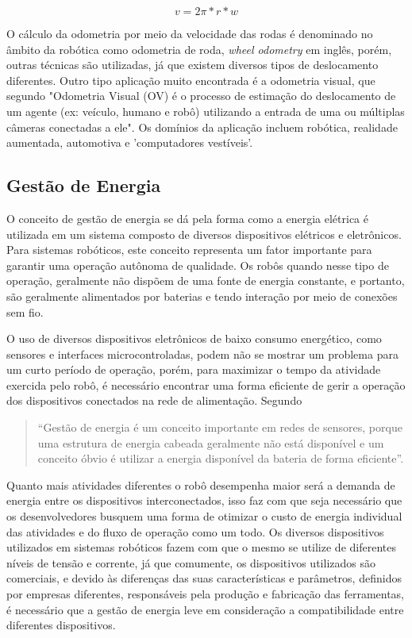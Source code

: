 \begin{equation}\label{eq:vel}
v = 2\pi*r*w
\end{equation}

O cálculo da odometria por meio da velocidade das rodas é denominado no âmbito da robótica como odometria de roda, \textit{wheel odometry} em inglês, porém, outras técnicas são utilizadas, já que existem diversos tipos de deslocamento diferentes. Outro tipo aplicação muito encontrada é a odometria visual, que segundo \cite{nister2004visual} "Odometria Visual (OV) é o processo de estimação do deslocamento de um agente (ex: veículo, humano e robô) utilizando a entrada de uma ou múltiplas câmeras conectadas a ele". Os domínios da aplicação incluem robótica, realidade aumentada, automotiva e 'computadores vestíveis'.

\subsection{Gestão de Energia}\label{sec:gestao}
O conceito de gestão de energia se dá pela forma como a energia elétrica é utilizada em um sistema composto de diversos dispositivos elétricos e eletrônicos. Para sistemas robóticos, este conceito representa um fator importante para garantir uma operação autônoma de qualidade. Os robôs quando nesse tipo de operação, geralmente não dispõem de uma fonte de energia constante, e portanto, são geralmente alimentados por baterias e tendo interação por meio de conexões sem fio. 

O uso de diversos dispositivos eletrônicos de baixo consumo energético, como sensores e interfaces microcontroladas, podem não se mostrar um problema para um curto período de operação, porém, para maximizar o tempo da atividade exercida pelo robô, é necessário encontrar uma forma eficiente de gerir a operação dos dispositivos conectados na rede de alimentação. Segundo \cite{katiraei2006power} 
\begin{quote}
“Gestão de energia é um conceito importante em redes de sensores, porque uma estrutura de energia cabeada geralmente não está disponível e um conceito óbvio é utilizar a energia disponível da bateria de forma eficiente”. 
\end{quote}	
Quanto mais atividades diferentes o robô desempenha maior será a demanda de energia entre os dispositivos interconectados, isso faz com que seja necessário que os desenvolvedores busquem uma forma de otimizar o custo de energia individual das atividades e do fluxo de operação como um todo. Os diversos dispositivos utilizados em sistemas robóticos fazem com que o mesmo se utilize de diferentes níveis de tensão e corrente, já que comumente, os dispositivos utilizados são comerciais, e devido às diferenças das suas características e parâmetros, definidos por empresas diferentes, responsáveis pela produção e fabricação das ferramentas, é necessário que a gestão de energia leve em consideração a compatibilidade entre diferentes dispositivos.

